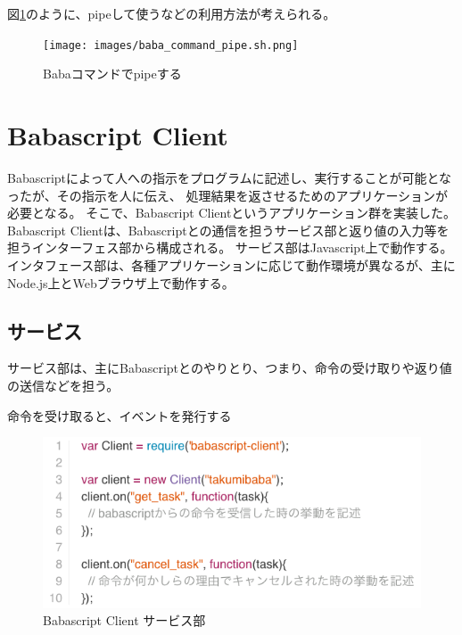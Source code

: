 図\ref{fig:baba_command_pipe}のように、pipeして使うなどの利用方法が考えられる。

\begin{figure}[htbp]
  \begin{center}
  \texttt{[image: images/baba\_command\_pipe.sh.png]}
  \end{center}
  \caption{Babaコマンドでpipeする}
  \label{fig:baba_command_pipe}
\end{figure}

\section{Babascript Client}\label{babascript-client}

Babascriptによって人への指示をプログラムに記述し、実行することが可能となったが、その指示を人に伝え、
処理結果を返させるためのアプリケーションが必要となる。
そこで、Babascript Clientというアプリケーション群を実装した。 Babascript
Clientは、Babascriptとの通信を担うサービス部と返り値の入力等を担うインターフェス部から構成される。
サービス部はJavascript上で動作する。
インタフェース部は、各種アプリケーションに応じて動作環境が異なるが、主にNode.js上とWebブラウザ上で動作する。

\subsection{サービス}\label{ux30b5ux30fcux30d3ux30b9}

サービス部は、主にBabascriptとのやりとり、つまり、命令の受け取りや返り値の送信などを担う。

命令を受け取ると、イベントを発行する

\begin{figure}[htbp]
  \begin{center}
  \includegraphics[width=.8\linewidth,bb=0 0 560 253]{images/babascript_client_service.js.png}
  \end{center}
  \caption{Babascript Client サービス部}
  \label{fig:babascript_client_service}
\end{figure}

